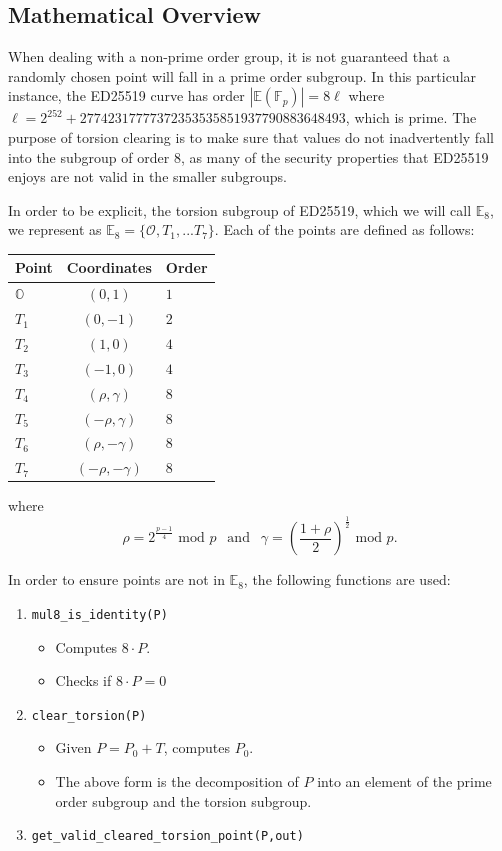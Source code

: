 \documentclass[12pt,titlepage,table]{article}
\begin{document}
\subsection{Mathematical Overview}
When dealing with a non-prime order group, it is not guaranteed that a randomly chosen point will fall in a prime order subgroup. In this particular instance, the ED25519 curve has order
$|\mathbb{E}(\mathbb{F}_p)| = 8 \ell$
where $\ell = 2^{252} + 27742317777372353535851937790883648493
$, which is prime. The purpose of torsion clearing is to make sure that values do not inadvertently fall into the subgroup of order 8, as many of the security properties that ED25519 enjoys are not valid in the smaller subgroups.

\medskip
In order to be explicit, the torsion subgroup of ED25519, which we will call $\mathbb{E}_8$, we represent as 
$\mathbb{E}_8 = \{\mathcal{O},T_1,...T_7\}.$
Each of the points are defined as follows:
\begin{table}[htbp]
\centering
{
\begin{tabular}{| l | c | l|}
\hline
\textbf{Point} & \textbf{Coordinates} & \textbf{Order} \\
\hline
\hline
$\mathbb{O}$ & $(0,1)$ & $1$ \\
$T_1$ & $(0,-1)$ & $2$ \\
$T_2$ & $(1,0)$ & $4$ \\
$T_3$ & $(-1,0) $ & $4$\\
$T_4$ & $(\rho, \gamma)$ & $8$ \\
$T_5$ & $(-\rho, \gamma)$& $8$\\
$T_6$ & $(\rho, -\gamma)$& $8$\\
$T_7$ & $(-\rho, -\gamma)$& $8$\\
\hline
\end{tabular}}
\end{table}
\newpage
where
$$\rho = 2^{\frac{p - 1}{4}} \text{ mod } p \ \ \text{ and } \ \ \gamma = \left(\frac{1 + \rho}{2}\right)^{\frac{1}{2}} \text{ mod } p.$$

\medskip
In order to ensure points are not in $\mathbb{E}_8$, the following functions are used:
\begin{enumerate}
\item \verb+mul8_is_identity(P)+
\begin{itemize}
\item Computes $8 \cdot P$.
\item Checks if $8 \cdot P=0$
\end{itemize}
\item \verb+clear_torsion(P)+
\begin{itemize}
\item Given $P = P_0 + T$, computes $P_0$.
\item The above form is the decomposition of $P$ into an element of the prime order subgroup and the torsion subgroup.
\end{itemize}
\item \verb+get_valid_cleared_torsion_point(P,out)+
\end{enumerate}
\end{document}
